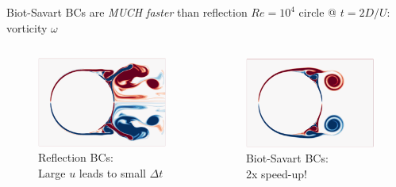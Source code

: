 \documentclass[aspectratio=169,small]{beamer}
\begin{document}
\begin{frame}[fragile]{Biot-Savart BCs are \textit{MUCH faster} than reflection} %
    \small{$Re=10^4$ circle @ $t=2D/U$: vorticity $\omega$} 
    \begin{columns}[onlytextwidth]
        \begin{column}{.5\textwidth}
        \begin{figure}
            \centering
            \includegraphics[height=0.6\textwidth]{fig/reflect_Re1e4_sim.png}
            \caption*{Reflection BCs: \\ Large $u$ leads to small $\Delta t$}
        \end{figure}
        \end{column}
        \begin{column}{.5\textwidth}
        \begin{figure}
            \centering
            \includegraphics[height=0.6\textwidth]{fig/biot_Re1e4_sim.png}
            \caption*{Biot-Savart BCs: \\ 2x speed-up!}
        \end{figure}
        \end{column}
    \end{columns}
\end{frame}
\end{document}

